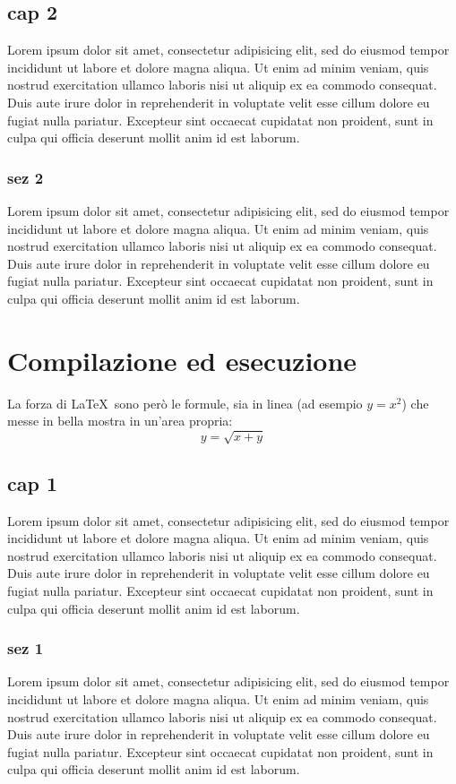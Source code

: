 \documentclass[a4paper,10pt]{report} %
\begin{document}
  \section{cap 2}
    Lorem ipsum dolor sit amet, consectetur adipisicing elit, sed do eiusmod tempor incididunt ut labore et dolore magna aliqua. Ut enim ad minim veniam, quis nostrud exercitation ullamco laboris nisi ut aliquip ex ea commodo consequat. Duis aute irure dolor in reprehenderit in voluptate velit esse cillum dolore eu fugiat nulla pariatur. Excepteur sint occaecat cupidatat non proident, sunt in culpa qui officia deserunt mollit anim id est laborum.
    \subsection{sez 2}
      Lorem ipsum dolor sit amet, consectetur adipisicing elit, sed do eiusmod tempor incididunt ut labore et dolore magna aliqua. Ut enim ad minim veniam, quis nostrud exercitation ullamco laboris nisi ut aliquip ex ea commodo consequat. Duis aute irure dolor in reprehenderit in voluptate velit esse cillum dolore eu fugiat nulla pariatur. Excepteur sint occaecat cupidatat non proident, sunt in culpa qui officia deserunt mollit anim id est laborum.
\newpage
\chapter{Compilazione ed esecuzione} %
	La forza di \LaTeX\ sono però le formule, sia in linea (ad esempio \(y=x^2\))
   che messe in bella mostra in un'area propria:
  \[y=\sqrt{x+y}\]
  \section{cap 1}
    Lorem ipsum dolor sit amet, consectetur adipisicing elit, sed do eiusmod tempor incididunt ut labore et dolore magna aliqua. Ut enim ad minim veniam, quis nostrud exercitation ullamco laboris nisi ut aliquip ex ea commodo consequat. Duis aute irure dolor in reprehenderit in voluptate velit esse cillum dolore eu fugiat nulla pariatur. Excepteur sint occaecat cupidatat non proident, sunt in culpa qui officia deserunt mollit anim id est laborum.
    \subsection{sez 1}
      Lorem ipsum dolor sit amet, consectetur adipisicing elit, sed do eiusmod tempor incididunt ut labore et dolore magna aliqua. Ut enim ad minim veniam, quis nostrud exercitation ullamco laboris nisi ut aliquip ex ea commodo consequat. Duis aute irure dolor in reprehenderit in voluptate velit esse cillum dolore eu fugiat nulla pariatur. Excepteur sint occaecat cupidatat non proident, sunt in culpa qui officia deserunt mollit anim id est laborum.
\end{document}
